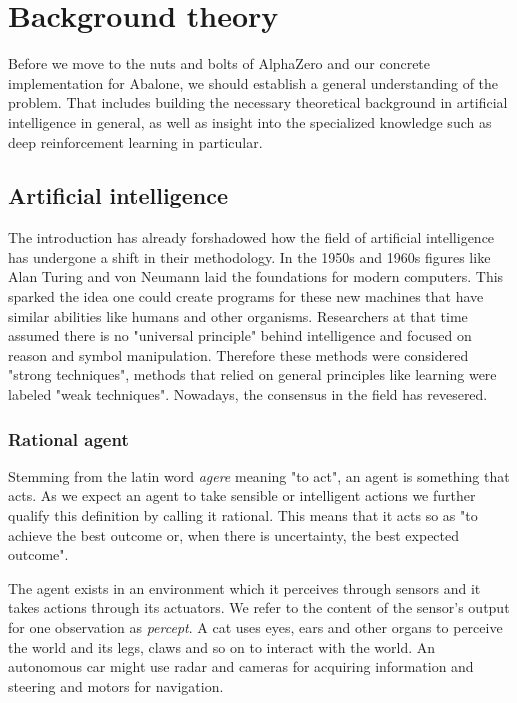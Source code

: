 \chapter{Background theory}
Before we move to the nuts and bolts of AlphaZero and our concrete implementation for Abalone, we should establish a general understanding of the problem. That includes building the necessary theoretical background in artificial intelligence in general, as well as insight into the specialized knowledge such as deep reinforcement learning in particular.

\section{Artificial intelligence}
The introduction has already forshadowed how the field of artificial intelligence has undergone a shift in their methodology. In the 1950s and 1960s figures like Alan Turing and von Neumann laid the foundations for modern computers. This sparked the idea one could create programs for these new machines that have similar abilities like humans and other organisms. Researchers at that time assumed there is no "universal principle" behind intelligence and focused on reason and symbol manipulation. Therefore these methods were considered "strong techniques", methods that relied on general principles like learning were labeled "weak techniques". Nowadays, the consensus in the field has revesered. \cite[p. 8f.]{sutton_reinforcement_2018}

\subsection{Rational agent}
Stemming from the latin word \textit{agere} meaning "to act", an agent is something that acts. As we expect an agent to take sensible or intelligent actions we further qualify this definition by calling it rational. This means that it acts so as "to achieve the best outcome or, when there is uncertainty, the best expected outcome". \cite[p. 36]{russell_artificial_2021}

The agent exists in an environment which it perceives through sensors and it takes actions through its actuators. We refer to the content of the sensor's output for one observation as \textit{percept}. A cat uses eyes, ears and other organs to perceive the world and its legs, claws and so on to interact with the world. An autonomous car might use radar and cameras for acquiring information and steering and motors for navigation.

